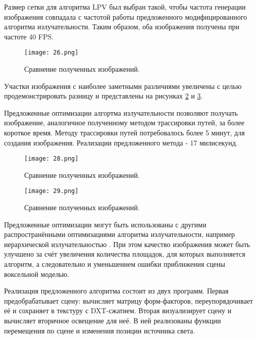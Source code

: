 \documentclass[12pt,fleqn]{article}
\begin{document}
Размер сетки для алгоритма LPV был выбран такой, чтобы частота генерации изображения совпадала с частотой работы предложенного модифицированного алгоритма излучательности. Таким образом, оба изображения получены при частоте 40 FPS.

\pagebreak

\begin{figure}[htb]
    \centering
    \texttt{[image: 26.png]}
    \caption{Сравнение полученных изображений.}
    \label{image_comparison}
\end{figure}

Участки изображения с наиболее заметными различиями увеличены с целью продемонстрировать разницу и представлены на рисунках \ref{image_comparison2} и \ref{image_comparison3}.

Предложенные оптимизации алгортма излучательности позволяют получать изображение, аналогичное полученному методом трассировки путей, за более короткое время. Методу трассировки путей потребовалось более 5 минут, для создания изображения. Реализации предложенного метода - 17 милисекунд.

\pagebreak

\begin{figure}[htb]
    \centering
    \texttt{[image: 28.png]}
    \caption{Сравнение полученных изображений.}
    \label{image_comparison2}
\end{figure}

\begin{figure}[htb]
    \centering
    \texttt{[image: 29.png]}
    \caption{Сравнение полученных изображений.}
    \label{image_comparison3}
\end{figure}

Предложенные оптимизации могут быть использованы с другими распространёнными оптимизациями алгоритма излучательности, например иерархической излучательностью \cite{DDP99}. При этом качество изображения может быть улучшено за счёт увеличения количества площадок, для которых выполняется алгоритм, а следовательно и уменьшением ошибки приближения сцены воксельной моделью.

Реализация предложенного алгоритма состоит из двух программ. Первая предобрабатывает сцену: вычисляет матрицу форм-факторов, переупорядочивает её и сохраняет в текстуру с DXT-сжатием. Вторая визуализирует сцену и вычисляет вторичное освещение для неё. В ней реализованы функции перемещения по сцене и изменения позиции источника света.

\pagebreak
\end{document}
